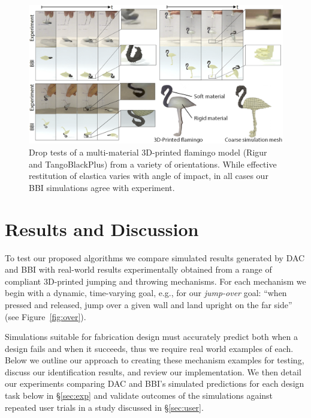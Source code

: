 \begin{figure}
	\centering
	\includegraphics[width=\columnwidth]{images/FlamingoDrop.png}	
	\caption{Drop tests of a multi-material 3D-printed flamingo model (Rigur and TangoBlackPlus) from a variety of orientations. While effective restitution of elastica varies with angle of impact, in all cases our BBI simulations agree with experiment.}
	\label{fig:flamingo_contact}
	\vspace{-10px}
\end{figure}
\section{Results and Discussion}
\label{sec:results}

To test our proposed algorithms we compare simulated results generated by DAC and BBI with real-world results experimentally obtained from a range of compliant 3D-printed jumping and throwing mechanisms.
For each mechanism we begin with a dynamic, time-varying goal, e.g., for our \emph{jump-over} goal: ``when pressed and released, jump over a given wall and land upright on the far side'' (see Figure~\ref{fig:over}).

Simulations suitable for fabrication design must accurately predict both when a design fails and when it succeeds, thus we require real world examples of each. Below we outline our approach to creating these mechanism examples for testing, discuss our identification results, and review our implementation. We then detail our experiments comparing DAC and BBI's simulated predictions for each design task below in \S\ref{sec:exp} and validate outcomes of the simulations against repeated user trials in a study discussed in \S\ref{sec:user}.

